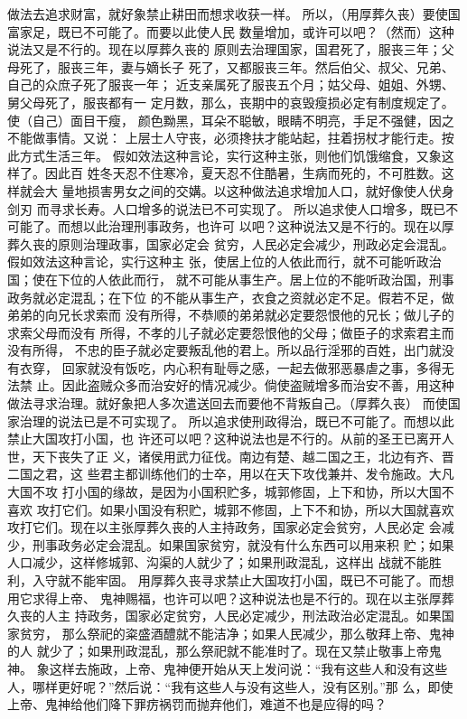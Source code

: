 \documentclass[12pt,UTF8]{ctexbook}
\begin{document}
做法去追求财富，就好象禁止耕田而想求收获一样。 
所以，（用厚葬久丧）要使国富家足，既已不可能了。而要以此使人民 
数量增加，或许可以吧？（然而）这种说法又是不行的。现在以厚葬久丧的 
原则去治理国家，国君死了，服丧三年；父母死了，服丧三年，妻与嫡长子 
死了，又都服丧三年。然后伯父、叔父、兄弟、自己的众庶子死了服丧一年； 
近支亲属死了服丧五个月；姑父母、姐姐、外甥、舅父母死了，服丧都有一 
定月数，那么，丧期中的哀毁瘦损必定有制度规定了。使（自己）面目干瘦， 
颜色黝黑，耳朵不聪敏，眼睛不明亮，手足不强健，因之不能做事情。又说： 
上层士人守丧，必须搀扶才能站起，拄着拐杖才能行走。按此方式生活三年。 
假如效法这种言论，实行这种主张，则他们饥饿缩食，又象这样了。因此百 
姓冬天忍不住寒冷，夏天忍不住酷暑，生病而死的，不可胜数。这样就会大 
量地损害男女之间的交媾。以这种做法追求增加人口，就好像使人伏身剑刃 
而寻求长寿。人口增多的说法已不可实现了。 
所以追求使人口增多，既已不可能了。而想以此治理刑事政务，也许可 
以吧？这种说法又是不行的。现在以厚葬久丧的原则治理政事，国家必定会 
贫穷，人民必定会减少，刑政必定会混乱。假如效法这种言论，实行这种主 
张，使居上位的人依此而行，就不可能听政治国；使在下位的人依此而行， 
就不可能从事生产。居上位的不能听政治国，刑事政务就必定混乱；在下位 
的不能从事生产，衣食之资就必定不足。假若不足，做弟弟的向兄长求索而 
没有所得，不恭顺的弟弟就必定要怨恨他的兄长；做儿子的求索父母而没有 
所得，不孝的儿子就必定要怨恨他的父母；做臣子的求索君主而没有所得， 
不忠的臣子就必定要叛乱他的君上。所以品行淫邪的百姓，出门就没有衣穿， 
回家就没有饭吃，内心积有耻辱之感，一起去做邪恶暴虐之事，多得无法禁 
止。因此盗贼众多而治安好的情况减少。倘使盗贼增多而治安不善，用这种 
做法寻求治理。就好象把人多次遣送回去而要他不背叛自己。（厚葬久丧） 
而使国家治理的说法已是不可实现了。 
所以追求使刑政得治，既已不可能了。而想以此禁止大国攻打小国，也 
许还可以吧？这种说法也是不行的。从前的圣王已离开人世，天下丧失了正 
义，诸侯用武力征伐。南边有楚、越二国之王，北边有齐、晋二国之君，这 
些君主都训练他们的士卒，用以在天下攻伐兼并、发令施政。大凡大国不攻 
打小国的缘故，是因为小国积贮多，城郭修固，上下和协，所以大国不喜欢 
攻打它们。如果小国没有积贮，城郭不修固，上下不和协，所以大国就喜欢 
攻打它们。现在以主张厚葬久丧的人主持政务，国家必定会贫穷，人民必定 
会减少，刑事政务必定会混乱。如果国家贫穷，就没有什么东西可以用来积 
贮；如果人口减少，这样修城郭、沟渠的人就少了；如果刑政混乱，这样出 
战就不能胜利，入守就不能牢固。 
用厚葬久丧寻求禁止大国攻打小国，既已不可能了。而想用它求得上帝、 
鬼神赐福，也许可以吧？这种说法也是不行的。现在以主张厚葬久丧的人主 
持政务，国家必定贫穷，人民必定减少，刑法政治必定混乱。如果国家贫穷， 
那么祭祀的粢盛酒醴就不能洁净；如果人民减少，那么敬拜上帝、鬼神的人 
就少了；如果刑政混乱，那么祭祀就不能准时了。现在又禁止敬事上帝鬼神。 
象这样去施政，上帝、鬼神便开始从天上发问说：“我有这些人和没有这些 
人，哪样更好呢？”然后说：“我有这些人与没有这些人，没有区别。”那 
么，即使上帝、鬼神给他们降下罪疠祸罚而抛弃他们，难道不也是应得的吗？ 
\end{document}
